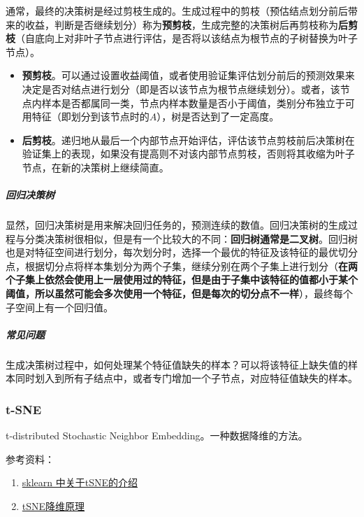 
通常，最终的决策树是经过剪枝生成的。生成过程中的剪枝（预估结点划分前后带来的收益，判断是否继续划分）称为\textbf{预剪枝}，生成完整的决策树后再剪枝称为\textbf{后剪枝}（自底向上对非叶子节点进行评估，是否将以该结点为根节点的子树替换为叶子节点）。
\begin{itemize}
\item \textbf{预剪枝}。可以通过设置收益阈值，或者使用验证集评估划分前后的预测效果来决定是否对结点进行划分（即是否以该节点为根节点继续划分）。或者，该节点内样本是否都属同一类，节点内样本数量是否小于阈值，类别分布独立于可用特征（即划分到该节点时的$A$），树是否达到了一定高度。
\item \textbf{后剪枝}。递归地从最后一个内部节点开始评估，评估该节点剪枝前后决策树在验证集上的表现，如果没有提高则不对该内部节点剪枝，否则将其收缩为叶子节点，在新的决策树上继续简直。
\end{itemize}

\subparagraph{回归决策树}显然，回归决策树是用来解决回归任务的，预测连续的数值。回归决策树的生成过程与分类决策树很相似，但是有一个比较大的不同：\textbf{回归树通常是二叉树}。回归树也是对特征空间进行划分，每次划分时，选择一个最优的特征及该特征的最优切分点，根据切分点将样本集划分为两个子集，继续分别在两个子集上进行划分（\textbf{在两个子集上依然会使用上一层使用过的特征，但是由于子集中该特征的值都小于某个阈值，所以虽然可能会多次使用一个特征，但是每次的切分点不一样}），最终每个子空间上有一个回归值。

\subparagraph{常见问题}
\begin{myenumerate}
\item 生成决策树过程中，如何处理某个特征值缺失的样本？可以将该特征上缺失值的样本同时划入到所有子结点中，或者专门增加一个子节点，对应特征值缺失的样本。
\item 
\end{myenumerate}


\subsubsection{t-SNE}
t-distributed Stochastic Neighbor Embedding。一种数据降维的方法。

参考资料：
\begin{enumerate}
	\item \href{https://scikit-learn.org/stable/modules/manifold.html#t-distributed-stochastic-neighbor-embedding-t-sne}{sklearn 中关于tSNE的介绍}
	\item \href{https://www.jianshu.com/p/700f017cd330}{tSNE降维原理}
\end{enumerate}

